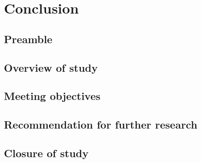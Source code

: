 \chapter{Conclusion}
\label{chap:4}


\section{Preamble}

\section{Overview of study}

\section{Meeting objectives}

\section{Recommendation for further research}

\section{Closure of study}